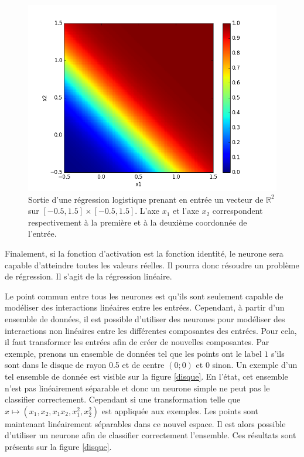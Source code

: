 \begin{figure}
\begin{center}
\includegraphics[scale=0.5]{images/chapter1/or.png}
\caption{Sortie d'une régression logistique prenant en entrée un vecteur de $\mathbb{R}^2$ sur $[-0.5, 1.5] \times [-0.5, 1.5]$. L'axe $x_1$ et l'axe $x_2$ correspondent respectivement à la première et à la deuxième coordonnée de l'entrée.}
\label{regression_logistique}
\end{center}
\end{figure}

\begin{example}
Finalement, si la fonction d'activation est la fonction identité, le neurone sera capable d'atteindre toutes les valeurs réelles. Il pourra donc résoudre un problème de régression. Il s'agit de la régression linéaire.
\end{example}

Le point commun entre tous les neurones est qu'ils sont seulement capable de modéliser des interactions linéaires entre les entrées. Cependant, à partir d'un ensemble de données, il est possible d'utiliser des neurones pour modéliser des interactions non linéaires entre les différentes composantes des entrées. Pour cela, il faut transformer les entrées afin de créer de nouvelles composantes. Par exemple, prenons un ensemble de données tel que les points ont le label $1$ s'ils sont dans le disque de rayon 0.5 et de centre $(0;0)$ et $0$ sinon. Un exemple d'un tel ensemble de donnée est visible sur la figure \ref{disque}. En l'état, cet ensemble n'est pas linéairement séparable et donc un neurone simple ne peut pas le classifier correctement. Cependant si une transformation telle que $x \mapsto (x_1, x_2, x_1x_2, x_1^2, x_2^2)$ est appliquée aux exemples. Les points sont maintenant linéairement séparables dans ce nouvel espace. Il est alors possible d'utiliser un neurone afin de classifier correctement l'ensemble. Ces résultats sont présents sur la figure \ref{disque}.

